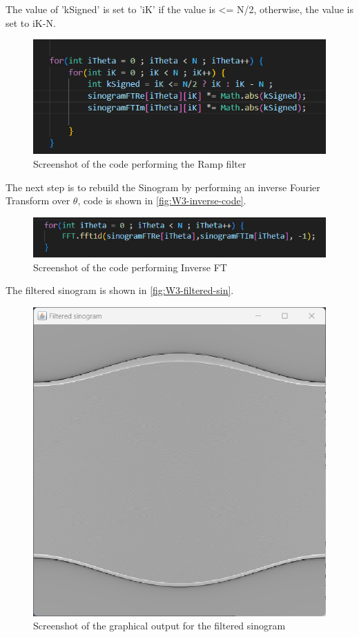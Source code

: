 The value of 'kSigned' is set to 'iK' if the value is <= N/2, otherwise, the value is set to iK-N.   
\begin{figure}[H] 
    \centering
    \includegraphics[width=0.9\columnwidth]{Figures/Week 3/ramp-filter-code.png}
    \caption{Screenshot of the code performing the Ramp filter}
    \label{fig:W3-ramp-code}
\end{figure}

The next step is to rebuild the Sinogram by performing an inverse Fourier Transform over \(\theta\), code is shown in \autoref{fig:W3-inverse-code}.

\begin{figure}[H] 
    \centering
    \includegraphics[width=0.9\columnwidth]{Figures/Week 3/inverse-FT.png}
    \caption{Screenshot of the code performing Inverse FT }
    \label{fig:W3-inverse-code}
\end{figure}

The filtered sinogram is shown in \autoref{fig:W3-filtered-sin}.
\begin{figure}[H] 
    \centering
    \includegraphics[width=0.9\columnwidth]{Figures/Week 3/filtered-sinorgram.png}
    \caption{Screenshot of the graphical output for the filtered sinogram}
    \label{fig:W3-filtered-sin}
\end{figure}


